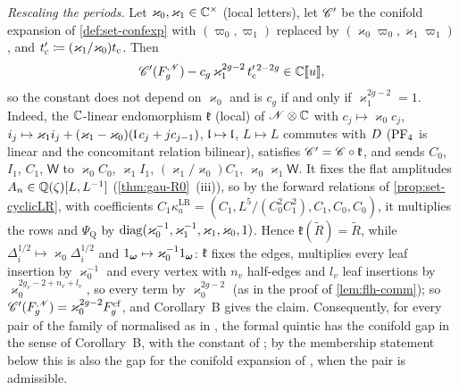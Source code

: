 \emph{Rescaling the periods.} Let $\varkappa_0,\varkappa_1\in\mathbb{C}^\times$ (local letters), let $\mathscr{C}'$ be the conifold expansion of \cref{def:set-confexp} with $(\varpi_0,\varpi_1)$ replaced by $(\varkappa_0\varpi_0,\varkappa_1\varpi_1)$, and $t_{\mathrm{c}}'\coloneqq(\varkappa_1/\varkappa_0)t_{\mathrm{c}}$. Then
\[
\mathscr{C}'(F_g^{\mathscr{N}})-c_g\,\varkappa_1^{2g-2}\,t_{\mathrm{c}}'^{\,2-2g}\in\mathbb{C}[\![ u ]\!],
\]
so the constant does not depend on $\varkappa_0$ and is $c_g$ if and only if $\varkappa_1^{2g-2}=1$. Indeed, the $\mathbb{C}$-linear endomorphism $\mathfrak k$ (local) of $\mathscr{N}\otimes\mathbb{C}$ with $c_j\mapsto\varkappa_0c_j$, $i_j\mapsto\varkappa_1i_j+(\varkappa_1-\varkappa_0)(\mathfrak{l}\,c_j+jc_{j-1})$, $\mathfrak{l}\mapsto\mathfrak{l}$, $L\mapsto L$ commutes with $D$ ($\mathrm{PF}_{4}$ is linear and the concomitant relation bilinear), satisfies $\mathscr{C}'=\mathscr{C}\circ\mathfrak k$, and sends $C_0$, $I_1$, $C_1$, $\mathsf W$ to $\varkappa_0C_0$, $\varkappa_1I_1$, $(\varkappa_1/\varkappa_0)C_1$, $\varkappa_0\varkappa_1\mathsf W$. It fixes the flat amplitudes $A_n\in\mathbb{Q}(\zeta)[L,L^{-1}]$ (\cref{thm:gau-R0}~(iii)), so by the forward relations of \cref{prop:set-cyclicLR}, with coefficients $C_1\kappa^{\mathrm{LR}}_a=(C_1,L^5/(C_0^2C_1^2),C_1,C_0,C_0)$, it multiplies the rows and $\Psi_{\mathrm Q}$ by $\operatorname{diag}(\varkappa_0^{-1},\varkappa_1^{-1},\varkappa_1,\varkappa_0,1)$. Hence $\mathfrak k(\tilde R)=\tilde R$, while $\Delta_i^{1/2}\mapsto\varkappa_0\Delta_i^{1/2}$ and $1_{\boldsymbol{\omega}}\mapsto\varkappa_0^{-1}1_{\boldsymbol{\omega}}$: $\mathfrak k$ fixes the edges, multiplies every leaf insertion by $\varkappa_0^{-1}$ and every vertex with $n_v$ half-edges and $l_v$ leaf insertions by $\varkappa_0^{2g_v-2+n_v+l_v}$, so every term by $\varkappa_0^{2g-2}$ (as in the proof of \cref{lem:flh-comm}); so $\mathscr{C}'(F_g^{\mathscr{N}})=\varkappa_0^{2g-2}F_g^{\mathrm{cf}}$, and Corollary~B gives the claim. Consequently, for every pair of the family of \cite[Rem.~1.4]{CGYZ26} normalised as in \cite[Prop.-Def.~4.5\,(1)]{CGYZ26}, the formal quintic has the conifold gap in the sense of Corollary~B, with the constant of \cite[Conj.~1.5]{CGYZ26}; by the membership statement below this is also the gap for the conifold expansion of \cite[Def.~1.2]{CGYZ26}, when the pair is admissible.

